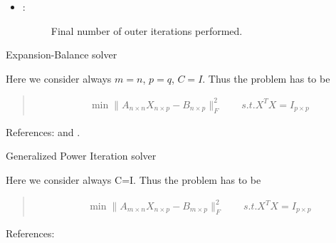 \documentclass[a4paper,10pt,english]{sphinxmanual}
\begin{document}
\begin{fulllineitems}
\begin{itemize}
\begin{description}
\end{description}

\item {} \begin{description}
\item[{: }] \leavevmode
Final number of outer iterations performed.

\end{description}

\end{itemize}

\end{fulllineitems}


\begin{fulllineitems}
\label{\detokenize{skprocrustes:skprocrustes.eb_solver}}
Expansion-Balance solver

Here we consider always \(m=n\), \(p=q\), \(C=I\).
Thus the problem has to be
\begin{quote}
\begin{equation*}
\begin{split}\min \lVert A_{n\times n}X_{n\times p}-B_{n\times p}\rVert_F^2 
\qquad s.t. X^TX=I_{p\times p}    \end{split}
\end{equation*}\end{quote}

References: \label{\detokenize{skprocrustes:id18}}{\hyperref[\detokenize{skprocrustes:zhandu06}]{\sphinxcrossref{{[}ZD06{]}}}} and \label{\detokenize{skprocrustes:id19}}{\hyperref[\detokenize{skprocrustes:bergknol84}]{\sphinxcrossref{{[}tBK84{]}}}}.

\end{fulllineitems}


\begin{fulllineitems}
\label{\detokenize{skprocrustes:skprocrustes.gpi_solver}}
Generalized Power Iteration solver

Here we consider always C=I.
Thus the problem has to be
\begin{quote}
\begin{equation*}
\begin{split}\min \lVert A_{m\times n}X_{n\times p}-B_{m\times p}\rVert_F^2 
\qquad s.t. X^TX=I_{p\times p}    \end{split}
\end{equation*}\end{quote}

References: \label{\detokenize{skprocrustes:id20}}{\hyperref[\detokenize{skprocrustes:niezhanli17}]{\sphinxcrossref{{[}NZL17{]}}}}

\end{fulllineitems}
\end{document}
